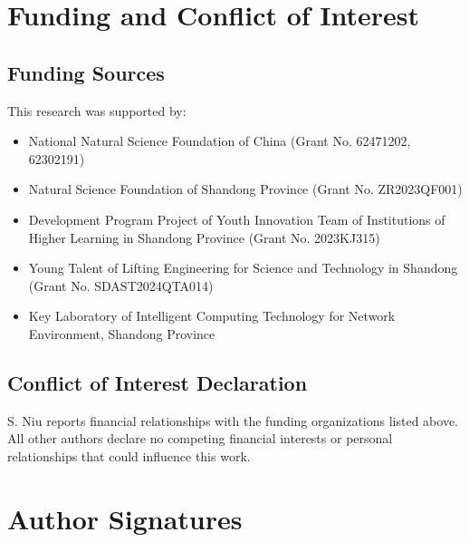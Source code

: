 \documentclass[12pt]{article}
\begin{document}
\section*{Funding and Conflict of Interest}

\subsection*{Funding Sources}
This research was supported by:
\begin{itemize}
    \item National Natural Science Foundation of China (Grant No. 62471202, 62302191)
    \item Natural Science Foundation of Shandong Province (Grant No. ZR2023QF001)
    \item Development Program Project of Youth Innovation Team of Institutions of Higher Learning in Shandong Province (Grant No. 2023KJ315)
    \item Young Talent of Lifting Engineering for Science and Technology in Shandong (Grant No. SDAST2024QTA014)
    \item Key Laboratory of Intelligent Computing Technology for Network Environment, Shandong Province
\end{itemize}

\subsection*{Conflict of Interest Declaration}
S. Niu reports financial relationships with the funding organizations listed above. All other authors declare no competing financial interests or personal relationships that could influence this work.

\section*{Author Signatures}
\end{document}
